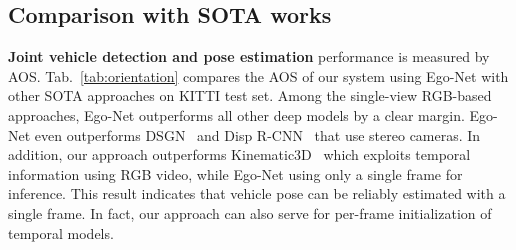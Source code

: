 \documentclass[final]{cvpr}
\begin{document}
\subsection{Comparison with SOTA works} 
\noindent \textbf{Joint vehicle detection and pose estimation} performance is measured by AOS. Tab.~\ref{tab:orientation} compares the AOS of our system using Ego-Net with other SOTA approaches on KITTI test set. Among the single-view RGB-based approaches, Ego-Net outperforms all other deep models by a clear margin. Ego-Net even outperforms DSGN~\cite{chen2020dsgn} and Disp R-CNN~\cite{sun2020disp} that use stereo cameras. In addition, our approach outperforms Kinematic3D~\cite{kinematic-3d} which exploits temporal information using RGB video, while Ego-Net using only a single frame for inference. This result indicates that vehicle pose can be reliably estimated with a single frame. In fact, our approach can also serve for per-frame initialization of temporal models.
\end{document}
